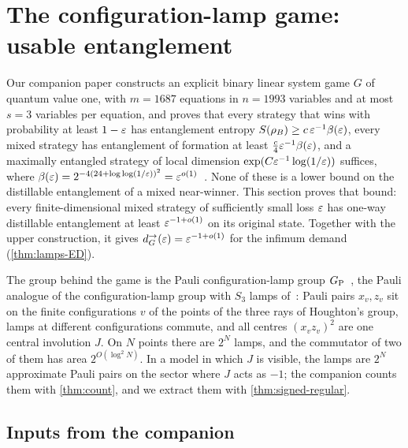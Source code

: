 \section{The configuration-lamp game: usable entanglement}\label{sec:lamps}

Our companion paper constructs an explicit binary linear system game $G$ of quantum value one, with $m=1687$ equations in
$n=1993$ variables and at most $s=3$ variables per equation, and proves that every strategy that wins with probability at least
$1-\varepsilon$ has entanglement entropy $S(\rho_B)\ge c\,\varepsilon^{-1}\beta(\varepsilon)$, every mixed strategy has entanglement of formation at
least $\frac c4\varepsilon^{-1}\beta(\varepsilon)$, and a maximally entangled strategy of local dimension $\exp(C\varepsilon^{-1}\log(1/\varepsilon))$
suffices, where $\beta(\varepsilon)=2^{-4(24+\log\log(1/\varepsilon))^2}=\varepsilon^{o(1)}$~\cite[Theorem~A, Theorem~10.5 and Corollary~10.6]{DM-game}.
None of these is a lower bound on the distillable entanglement of a mixed near-winner. This section proves that bound: every
finite-dimensional mixed strategy of sufficiently small loss $\varepsilon$ has one-way distillable entanglement at least
$\varepsilon^{-1+o(1)}$ on its original state. Together with the upper construction, it gives $d^\to_G(\varepsilon)=\varepsilon^{-1+o(1)}$ for the
infimum demand (\cref{thm:lamps-ED}).

The group behind the game is the Pauli configuration-lamp group $G_{\mathrm P}$~\cite[Section~6]{DM-game}, the Pauli analogue of the
configuration-lamp group with $S_3$ lamps of~\cite[Section~3]{DM-lamps}: Pauli pairs $x_v,z_v$ sit on the finite configurations $v$
of the points of the three rays of Houghton's group, lamps at different configurations commute, and all centres $(x_vz_v)^2$ are
one central involution $J$. On $N$ points there are $2^N$ lamps, and the commutator of two of them has area $2^{O(\log^2N)}$. In a
model in which $J$ is visible, the lamps are $2^N$ approximate Pauli pairs on the sector where $J$ acts as $-1$; the companion
counts them with \cref{thm:count}, and we extract them with \cref{thm:signed-regular}.

\subsection{Inputs from the companion}\label{sec:lamps-inputs}

